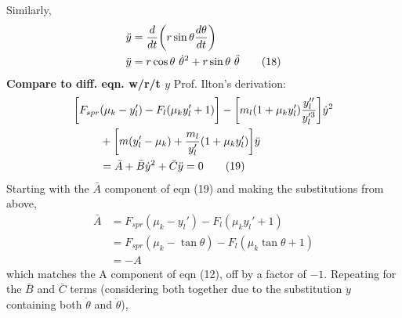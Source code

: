 \documentclass[12pt]{article}
\begin{document}
Similarly,
\begin{align}
    \ddot{y} & = \frac{d}{dt}\biggl( r \sin{\theta} \frac{d\theta}{dt}\biggr) \notag \\
    \ddot{y} & = r \cos{\theta} \ \dot{\theta}^2 + r \sin{\theta} \ \ddot{\theta} \tag{18}
\end{align}
\newline
\noindent \textbf{Compare to diff. eqn. w/r/t $y$}
\newline
Prof. Ilton's derivation:
\begin{align}
    \biggl[ F_{spr} & (\mu_k - y_l') - F_l(\mu_k y_l' + 1) \biggr] - \biggl[ m_l (1 + \mu_k y_l') \frac{y_l''}{y_l'^3} \biggr] \dot{y}^2 \notag \\
    & + \biggl[ m (y_l' - \mu_k) + \frac{m_l}{y_l'} (1 + \mu_k y_l') \biggr] \ddot{y} \notag \\
    & = \bar A + \bar B \dot{y}^2 + \bar C \ddot{y} = 0 \tag{19}
\end{align}
\newline
Starting with the $\bar A$ component of eqn (19) and making the substitutions from above,
\begin{align*}
    \bar A & = F_{spr} (\mu_k - y_l') - F_l(\mu_k y_l' + 1) \\
    & = F_{spr} (\mu_k - \tan{\theta}) - F_l(\mu_k \tan{\theta} + 1) \\
    & = -A
\end{align*}
which matches the A component of eqn (12), off by a factor of $-1$.
\newline \newline
Repeating for the $\bar B$ and $\bar C$ terms (considering both together due to the substitution $\ddot y$ containing both $\dot \theta$ and $\ddot \theta$),
\end{document}
